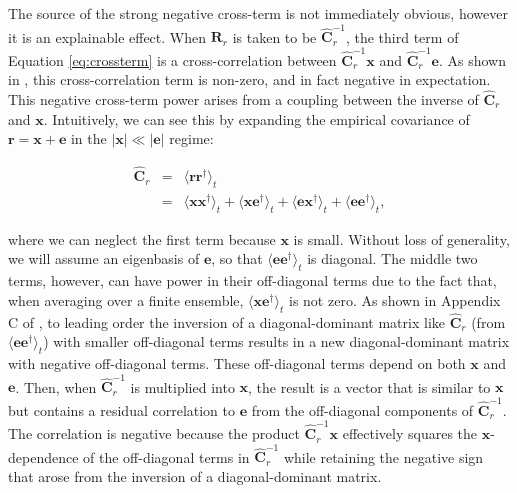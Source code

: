 \documentclass[preprint2,numberedappendix,tighten]{aastex6}  %
\begin{document}
The source of the strong negative cross-term is not immediately obvious, however it is an explainable effect. 
When $\textbf{R}_{r}$
is taken to be $\widehat{\textbf{C}}_{r}^{-1}$, the third term of Equation \eqref{eq:crossterm} is a cross-correlation between $\widehat{\textbf{C}}_{r}^{-1}\textbf{x}$ and
$\widehat{\textbf{C}}_{r}^{-1}\textbf{e}$. As shown in \citet{switzer_et_al2015}, this cross-correlation term is non-zero, and in fact negative in expectation. 
This negative cross-term power arises from a coupling between the inverse of 
$\widehat{\textbf{C}}_{r}$ and $\mathbf{x}$. 
Intuitively, we can see this by expanding the empirical covariance of $\textbf{r}=\textbf{x}+\textbf{e}$ in the
$|\textbf{x}|\ll|\textbf{e}|$ regime:

\begin{eqnarray}
\widehat{\textbf{C}}_{r} &=& \langle \textbf{rr}^{\dagger} \rangle_{t} \nonumber \\ 
&=& \langle \textbf{xx}^{\dagger} \rangle_{t} + \langle \textbf{xe}^{\dagger} \rangle_{t} + \langle \textbf{ex}^{\dagger} \rangle_{t} + \langle 
\textbf{ee}^{\dagger} \rangle_{t},
\end{eqnarray}

\noindent where we can neglect the first term because $\textbf{x}$ is small.  Without loss of generality, we will assume
an eigenbasis of $\textbf{e}$, so that $\langle 
\textbf{ee}^{\dagger} \rangle_{t}$ is diagonal. The middle 
two terms, however, can have power in their off-diagonal terms due to the fact that, when averaging over a finite
ensemble, $\langle\textbf{xe}^\dagger\rangle_t$ is not zero.  As shown in Appendix C of \citet{parsons_et_al2014}%
, to leading order the inversion of a diagonal-dominant matrix like $\widehat{\textbf{C}}_{r}$ (from $\langle 
\textbf{ee}^{\dagger} \rangle_{t}$) with smaller
off-diagonal terms results in a new diagonal-dominant matrix with negative off-diagonal terms. These off-diagonal
terms depend on both $\textbf{x}$ and $\textbf{e}$. Then, when $\widehat{\textbf{C}}^{-1}_{r}$ is multiplied into $\textbf{x}$,
the result is a vector that is similar to $\textbf{x}$ but
contains a residual correlation to $\textbf{e}$ from the off-diagonal components of $\widehat{\textbf{C}}^{-1}_{r}$. The
correlation is negative because the product $\widehat{\textbf{C}}_r^{-1}\textbf{x}$ effectively squares the $\textbf{x}$-dependence
of the off-diagonal terms in $\widehat{\textbf{C}}^{-1}_{r}$ while retaining the negative sign that arose from the inversion
of a diagonal-dominant matrix.
\end{document}
